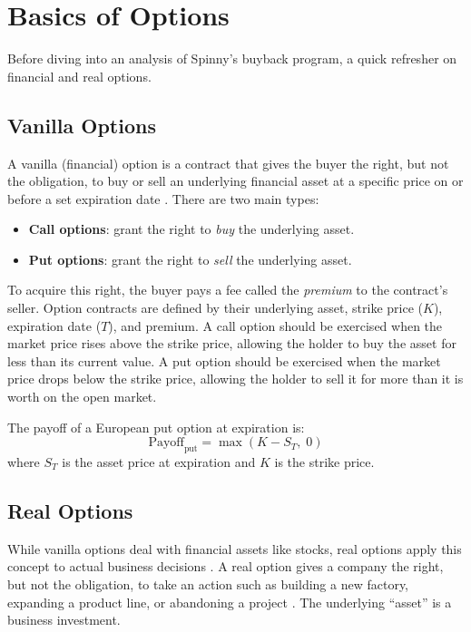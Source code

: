 \documentclass[11pt, a4paper]{article}
\begin{document}
\section{Basics of Options}
\label{sec:options_basics}

Before diving into an analysis of Spinny's buyback program, a quick refresher on financial and real options.

\subsection{Vanilla Options}

A vanilla (financial) option is a contract that gives the buyer the right, but not the obligation, to buy or sell an underlying financial asset at a specific price on or before a set expiration date \cite{hull2022}. There are two main types:

\begin{itemize}
    \item \textbf{Call options}: grant the right to \emph{buy} the underlying asset.
    \item \textbf{Put options}: grant the right to \emph{sell} the underlying asset.
\end{itemize}

To acquire this right, the buyer pays a fee called the \emph{premium} to the contract's seller. Option contracts are defined by their underlying asset, strike price ($K$), expiration date ($T$), and premium. A call option should be exercised when the market price rises above the strike price, allowing the holder to buy the asset for less than its current value. A put option should be exercised when the market price drops below the strike price, allowing the holder to sell it for more than it is worth on the open market.

The payoff of a European put option at expiration is:
\begin{equation}
    \text{Payoff}_{\text{put}} = \max(K - S_T, \; 0)
\end{equation}
where $S_T$ is the asset price at expiration and $K$ is the strike price.

\subsection{Real Options}

While vanilla options deal with financial assets like stocks, real options apply this concept to actual business decisions \cite{dixitpindyck1994}. A real option gives a company the right, but not the obligation, to take an action such as building a new factory, expanding a product line, or abandoning a project \cite{myers1977}. The underlying ``asset'' is a business investment.
\end{document}
